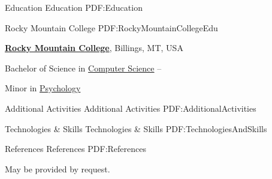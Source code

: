\documentclass[letterpaper,MMMyyyy,nonstopmode]{simpleresumecv}
\begin{document}
\begin{Body}

\Section
{Education}
{Education}
{PDF:Education}

\SubSection
{}
{Rocky Mountain College}
{PDF:RockyMountainCollegeEdu}

\Entry
\href{http://www.rocky.edu/}
{\textbf{Rocky Mountain College}},
Billings, MT, USA

\Gap
\BulletItem
Bachelor of Science in
\href{http://cs.rocky.edu/}
{Computer Science}
\hfill
{} --
\begin{Detail}
\SubBulletItem
Minor in 
\href{http://rocky.edu/academics/academic-programs/undergraduate-majors/psychology/}
{Psychology}
\end{Detail}


\Section
{Additional \newline Activities}
{Additional Activities}
{PDF:AdditionalActivities}


\Section
{Technologies \newline \& Skills}
{Technologies \& Skills}
{PDF:TechnologiesAndSkills}


\Section
{References}
{References}
{PDF:References}

May be provided by request.

\end{Body}
\end{document}
